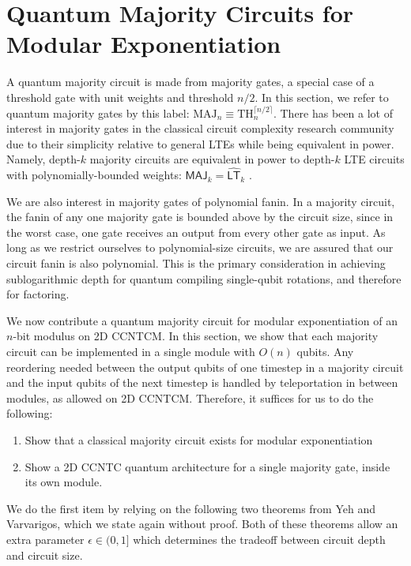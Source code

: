 \section{Quantum Majority Circuits for Modular Exponentiation}

A quantum majority circuit is made from majority gates, a special case
of a threshold gate with unit weights and threshold $n/2$. In this section, we refer
to quantum majority gates by this label:
$\text{MAJ}_n \equiv \text{TH}^{\lceil n/2 \rceil}_n$. There has been
a lot of interest in majority gates in the classical circuit complexity
research community due to their simplicity relative to general LTEs
while being equivalent in power. Namely, depth-$k$
majority circuits are equivalent in power to depth-$k$ LTE circuits
with polynomially-bounded weights: $\textsf{MAJ}_k = \hat{\textsf{LT}}_k$
\cite{Alon1994,Goldmann1994}.

We are also interest in majority gates of polynomial fanin.
In a majority circuit, the fanin of any one majority gate is
bounded above by the circuit size, since in the worst case, one
gate receives an output from every other gate as input. As long
as we restrict ourselves to polynomial-size circuits, we are
assured that our circuit fanin is also polynomial. This is the
primary consideration in achieving sublogarithmic depth for
quantum compiling single-qubit rotations, and therefore for
factoring.

We now contribute a quantum majority circuit for 
modular exponentiation
of an $n$-bit modulus on 2D CCNTCM. In this section, we show that each majority circuit
can be implemented in a single module with $O(n)$ qubits. Any
reordering needed between the output qubits of one timestep in a majority circuit
and the input qubits of the next timestep is handled by teleportation
in between modules, as allowed on 2D CCNTCM. Therefore, it suffices for
us to do the following:

\begin{enumerate}
\item Show that a classical majority circuit exists for modular exponentiation
\item Show a 2D CCNTC quantum architecture for a single majority gate, inside its own module.
\end{enumerate}

We do the first item by relying on the following two theorems from Yeh and Varvarigos,
which we state again without proof. Both of these theorems
allow an extra parameter $\epsilon \in (0,1]$ which determines the
tradeoff between circuit depth and circuit size.

